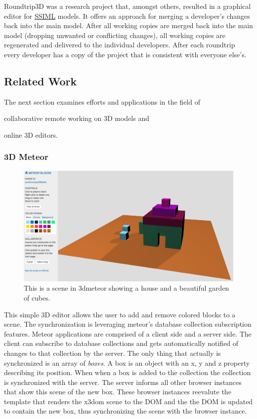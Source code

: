 Roundtrip3D was a research project that, amongst others, resulted in a
graphical editor for \hyperref[ssiml]{SSIML} models. It offers an
approach for merging a developer's changes back into the main model.
After all working copies are merged back into the main model (dropping
unwanted or conflicting changes), all working copies are regenerated and
delivered to the individual developers. After each roundtrip every
developer has a copy of the project that is consistent with everyone
else's.

\subsection{Related Work}
\label{related-work}

The next section examines efforts and applications in the field of

\begin{itemize*}
  \item collaborative remote working on 3D models and
  \item online 3D editors.
\end{itemize*}

\subsubsection{3D Meteor}
\label{d-meteor0}

\begin{figure}[htbp]
  \centering
  \includegraphics[width=12cm]{../assets/3dmeteor.png}
  \caption{This is a scene in 3dmeteor showing a house and a beautiful garden of cubes.}
	\label{fig:3dmeteor}
\end{figure}

This simple 3D editor allows the user to add and remove colored blocks to a
scene. The synchronization is leveraging meteor's database collection
subscription features. Meteor applications are comprised of a client side and a
server side. The client can subscribe to database collections and gets
automatically notified of changes to that collection by the server. The only
thing that actually is synchronized is an array of \emph{boxes}. A box is an
object with an x, y and z property describing its position. When when a box is
added to the collection the collection is synchronized with the server. The
server informs all other browser instances that show this scene of the new box.
These browser instances reevalute the template that renders the x3dom scene to
the DOM and the the DOM is updated to contain the new box, thus synchronizing
the scene with the browser instance. \cite{3dmeteor}

